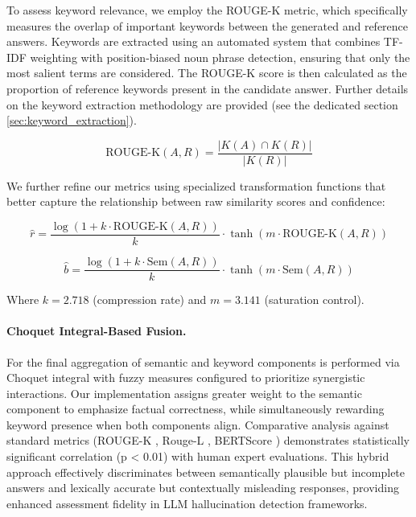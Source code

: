 \documentclass[sigconf]{acmart}
\begin{document}
To assess keyword relevance, we employ the ROUGE-K \cite{rouge_k} metric, which specifically measures the overlap of important keywords between the generated and reference answers. Keywords are extracted using an automated system that combines TF-IDF weighting with position-biased noun phrase detection, ensuring that only the most salient terms are considered. The ROUGE-K score is then calculated as the proportion of reference keywords present in the candidate answer. Further details on the keyword extraction methodology are provided (see the dedicated section \ref{sec:keyword_extraction}).

\begin{equation}
    \text{ROUGE-K}(A, R) = \frac{|K(A) \cap K(R)|}{|K(R)|}
\end{equation}

We further refine our metrics using specialized transformation functions that better capture the relationship between raw similarity scores and confidence:

\begin{equation}
\hat{r} = \frac{\log(1 + k \cdot \text{ROUGE-K}(A, R))}{k} \cdot \tanh(m \cdot \text{ROUGE-K}(A, R))
\end{equation}

\begin{equation}
\hat{b} = \frac{\log(1 + k \cdot \text{Sem}(A, R))}{k} \cdot \tanh(m \cdot \text{Sem}(A, R))
\end{equation}

Where $k=2.718$ (compression rate) and $m=3.141$ (saturation control).

\paragraph{Choquet Integral-Based Fusion.}
For the final aggregation of semantic and keyword components is performed via Choquet integral \cite{choquet1953capacities} with fuzzy measures configured to prioritize synergistic interactions. Our implementation assigns greater weight to the semantic component to emphasize factual correctness, while simultaneously rewarding keyword presence when both components align. Comparative analysis against standard metrics (ROUGE-K \cite{rouge_k}, Rouge-L \cite{rouge_l}, BERTScore \cite{bertscore}) demonstrates statistically significant correlation (p < 0.01) with human expert evaluations. This hybrid approach effectively discriminates between semantically plausible but incomplete answers and lexically accurate but contextually misleading responses, providing enhanced assessment fidelity in LLM hallucination detection frameworks.
\end{document}
